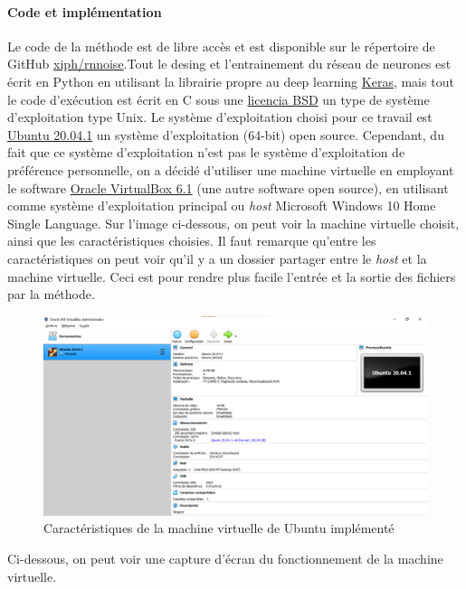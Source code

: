 \documentclass[conference,onecolumn]{IEEEtran}
\begin{document}
\paragraph{\textbf{Code et implémentation}}
Le code de la méthode est de libre accès et est disponible sur le répertoire de GitHub \href{https://github.com/xiph/rnnoise}{xiph/rnnoise}.Tout le desing et l’entrainement du réseau de neurones est écrit en Python en utilisant la librairie propre au deep learning \href{https://keras.io/}{Keras}, mais tout le code d’exécution est écrit en C sous une \href{https://es.wikipedia.org/wiki/Licencia_BSD}{licencia BSD} un type de système d’exploitation type Unix.
Le système d’exploitation choisi pour ce travail est \href{https://ubuntu.com/download/desktop}{Ubuntu 20.04.1} un système d’exploitation (64-bit) open source. Cependant, du fait que ce système d’exploitation n’est pas le système d’exploitation de préférence personnelle, on a décidé d’utiliser une machine virtuelle en employant le software \href{https://www.virtualbox.org/}{Oracle VirtualBox 6.1} (une autre software open source), en utilisant comme système d’exploitation principal ou \textit{host} Microsoft Windows 10 Home Single Language. Sur l’image ci-dessous, on peut voir la machine virtuelle choisit, ainsi que les caractéristiques choisies. Il faut remarque qu’entre les caractéristiques on peut voir qu’il y a un dossier partager entre le \textit{host} et la machine virtuelle. Ceci est pour rendre plus facile l’entrée et la sortie des fichiers par la méthode.

 \begin{figure}[H]
 \centering
    \includegraphics[scale=0.45]{VM1.png}
    \caption{ Caractéristiques de la machine virtuelle de Ubuntu implémenté} 
\end{figure}

Ci-dessous, on peut voir une capture d’écran du fonctionnement de la machine virtuelle.
\end{document}
